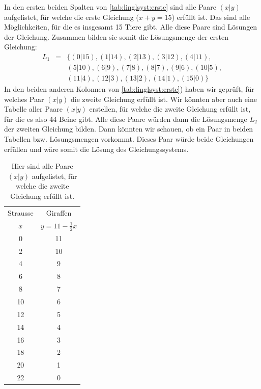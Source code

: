 \documentclass[%
11pt,%
twoside,%
titlepage,%
german,%
]{scrartcl}
\begin{document}
In den ersten beiden Spalten von \ref{tab:linglsyst:erste} sind alle Paare $(x|y)$ aufgelistet, f\"ur welche die erste Gleichung ($x+y=15$) erf\"ullt ist. Das sind alle M\"oglichkeiten, f\"ur die es insgesamt 15 Tiere gibt. Alle diese Paare sind L\"osungen der Gleichung. Zusammen bilden sie somit die L\"osungsmenge der ersten Gleichung:
\begin{eqnarray*}
  L_1 & = & \{(0|15),(1|14),(2|13),(3|12),(4|11), \\
  & & (5|10),(6|9),(7|8),(8|7),(9|6),(10|5), \\ 
  & & (11|4),(12|3),(13|2),(14|1),(15|0)\}
\end{eqnarray*}
In den beiden anderen Kolonnen von \ref{tab:linglsyst:erste}) haben wir gepr\"uft, f\"ur welches Paar $(x|y)$ die zweite Gleichung erf\"ullt ist. Wir k\"onnten aber auch eine Tabelle aller Paare $(x|y)$ erstellen, f\"ur welche die zweite Gleichung erf\"ullt ist, f\"ur die es also 44 Beine gibt. Alle diese Paare w\"urden dann die L\"osungsmenge $L_2$ der zweiten Gleichung bilden. Dann k\"onnten wir schauen, ob ein Paar in beiden Tabellen bzw. L\"osungsmengen vorkommt. Dieses Paar w\"urde beide Gleichungen erf\"ullen und w\"are somit die L\"osung des Gleichungssystems.

\begin{table}[b!]
  \centering
  \begin{tabular}{|c|c|}
    \hline
    Strausse & Giraffen\\
    $x$ & $y=11-\frac{1}{2}x$ \\ \hline\hline
    0 & 11 \\ \hline
    2 & 10 \\ \hline
    4 & 9 \\ \hline
    6 & 8 \\ \hline
    8 & 7 \\ \hline
    10 & 6 \\ \hline
    12 & 5 \\ \hline
    14 & 4 \\ \hline
    16 & 3 \\ \hline
    18 & 2 \\ \hline
    20 & 1 \\ \hline
    22 & 0 \\ \hline
  \end{tabular}
  \caption{Hier sind alle Paare $(x|y)$ aufgelistet, f\"ur welche die zweite Gleichung erf\"ullt ist.}
  \label{tab:linglsyst:zweite}
\end{table}
\end{document}
